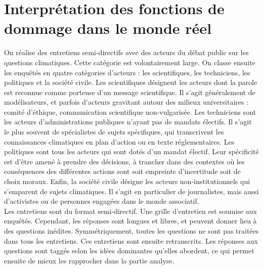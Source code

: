 \chapter{Interprétation des fonctions de dommage dans le monde réel}
\label{chapter:socio}





\begin{methodbox}

On réalise des entretiens semi-directifs avec des acteurs du débat public sur les questions climatiques. Cette catégorie est volontairement large. On classe ensuite les enquêtés en quatre catégories d'acteurs : les scientifiques, les techniciens, les politiques et la société civile. Les scientifiques désignent les acteurs dont la parole est reconnue comme porteuse d'un message scientifique. Il s'agit généralement de modélisateurs, et parfois d'acteurs gravitant autour des milieux universitaires : comité d'éthique, communication scientifique non-vulgarisée. Les techniciens sont les acteurs d'administrations publiques n'ayant pas de mandats électifs. Il s'agit le plus souvent de spécialistes de sujets spécifiques, qui transcrivent les connaissances climatiques en plan d'action ou en texte réglementaires. Les politiques sont tous les acteurs qui sont dotés d'un mandat électif. Leur spécificité est d'être amené à prendre des décisions, à trancher dans des contextes où les conséquences des différentes actions sont soit empreinte d'incertitude soit de choix moraux. Enfin, la société civile désigne les acteurs non-institutionnels qui s'emparent de sujets climatiques. Il s'agit en particulier de journalistes, mais aussi d'activistes ou de personnes engagées dans le monde associatif. \\

Les entretiens sont du format semi-directif. Une grille d'entretien est soumise aux enquêtés. Cependant, les réponses sont longues et libres, et peuvent donner lieu à des questions inédites. Symmétriquement, toutes les questions ne sont pas traitées dans tous les entretiens. Ces entretiens sont ensuite retranscrits. Les réponses aux questions sont taggés selon les idées dominantes qu'elles abordent, ce qui permet ensuite de mieux les rapprocher dans la partie analyse. 


\end{methodbox}










